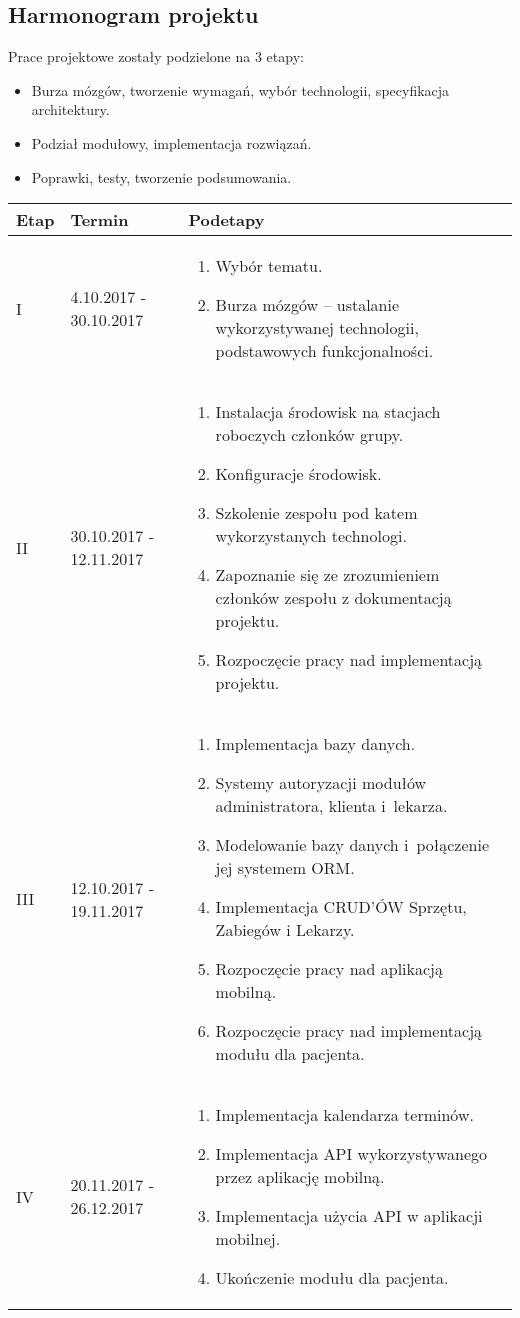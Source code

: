 \subsection{Harmonogram projektu}

Prace projektowe zostały podzielone na 3 etapy:
\begin{itemize}
	\item Burza mózgów, tworzenie wymagań, wybór technologii, specyfikacja architektury. 
	\item Podział modułowy, implementacja rozwiązań.
	\item Poprawki, testy, tworzenie podsumowania.
\end{itemize}

\begin{tabularx}{\textwidth}{|p{1cm}|p{4cm}|p{9.68cm}|}
	\hline
	Etap & Termin & Podetapy \tabularnewline \hline
	I & 4.10.2017 - 30.10.2017 &
		\begin{enumerate}
			\item Wybór tematu.
			\item Burza mózgów – ustalanie wykorzystywanej technologii, podstawowych funkcjonalności. 
		\end{enumerate}
		\tabularnewline \hline
	II & 30.10.2017 - 12.11.2017 &
		\begin{enumerate}
			\item Instalacja środowisk na stacjach roboczych członków grupy.
			\item Konfiguracje środowisk.
			\item Szkolenie zespołu pod katem wykorzystanych technologi.
			\item Zapoznanie się ze zrozumieniem członków zespołu z dokumentacją projektu.
			\item Rozpoczęcie pracy nad implementacją projektu.
		\end{enumerate}
	\tabularnewline \hline
	III & 12.10.2017 - 19.11.2017 &
	\begin{enumerate}
		\item Implementacja bazy danych.
		\item Systemy autoryzacji modułów administratora, klienta i~lekarza.
		\item Modelowanie bazy danych i~połączenie jej systemem ORM.
		\item Implementacja CRUD'ÓW Sprzętu, Zabiegów i Lekarzy.
		\item Rozpoczęcie pracy nad aplikacją mobilną.
		\item Rozpoczęcie pracy nad implementacją modułu dla pacjenta.
	\end{enumerate}
	\tabularnewline \hline
	IV & 20.11.2017 - 26.12.2017 &
		\begin{enumerate}
			\item Implementacja kalendarza terminów.
			\item Implementacja API wykorzystywanego przez aplikację mobilną.
			\item Implementacja użycia API w aplikacji mobilnej.
			\item Ukończenie modułu dla pacjenta.
		\end{enumerate}
	\tabularnewline \hline
\end{tabularx}
